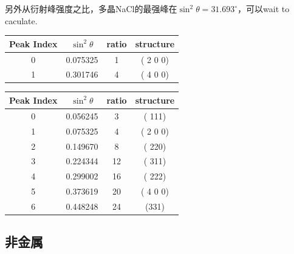 \documentclass[10pt]{ctexart}
\begin{document}
另外从衍射峰强度之比，多晶NaCl的最强峰在$\sin^2{\theta}= 31.693^\circ$，可以wait to caculate.

\begin{minipage}{0.45\textwidth}
    {\small
    \begin{tabular}{|c|c|c|c|}
        \textbf{Peak Index} & \textbf{$\sin^2{\theta}$}& \textbf{ratio}& \textbf{structure}\\
        \hline
        0  &  0.075325&1&( 2 0 0)\\
    1  &  0.301746&4&( 4 0 0)\\
    \end{tabular}
    }
    \centering
    \label{tab:NaCl_sPeakRatio}
    
\end{minipage}
\begin{minipage}{0.45\textwidth}
    {\small
    \begin{tabular}{|c|c|c|c|}
        \textbf{Peak Index} & \textbf{$\sin^2{\theta}$}& \textbf{ratio}& \textbf{structure}\\
        \hline
        0  &  0.056245&3&( 111)\\
        1  &  0.075325&4&( 2 0 0)\\
        2  &  0.149670&8&( 220)\\
        3  &  0.224344&12&( 311)\\
        4  &  0.299002&16&( 222)\\
        5  &  0.373619&20&( 4 0 0)\\
        6  &  0.448248&24&(331)\\
    \end{tabular}
    }
    \centering
    \label{tab:NaCl_mPeakRatio}
\end{minipage}
\subsection{非金属}
\end{document}
